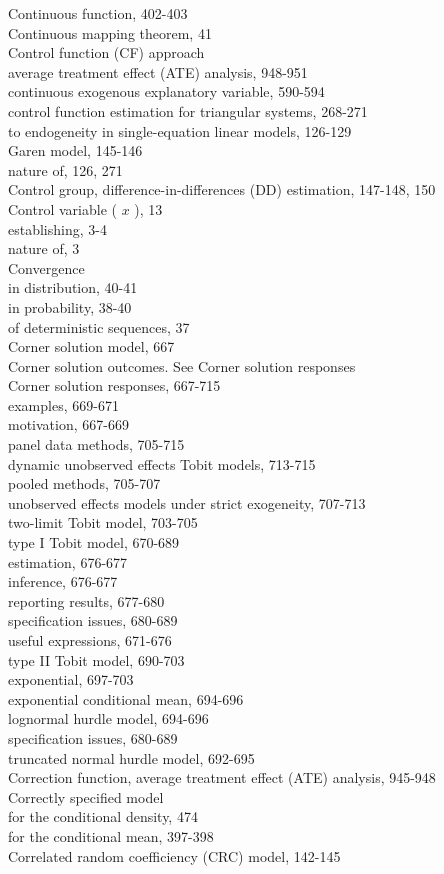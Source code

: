 \documentclass[10pt]{article}
\begin{document}
Continuous function, 402-403\\
Continuous mapping theorem, 41\\
Control function (CF) approach\\
average treatment effect (ATE) analysis, 948-951\\
continuous exogenous explanatory variable, 590-594\\
control function estimation for triangular systems, 268-271\\
to endogeneity in single-equation linear models, 126-129\\
Garen model, 145-146\\
nature of, 126, 271\\
Control group, difference-in-differences (DD) estimation, 147-148, 150\\
Control variable ( $x$ ), 13\\
establishing, 3-4\\
nature of, 3\\
Convergence\\
in distribution, 40-41\\
in probability, 38-40\\
of deterministic sequences, 37\\
Corner solution model, 667\\
Corner solution outcomes. See Corner solution responses\\
Corner solution responses, 667-715\\
examples, 669-671\\
motivation, 667-669\\
panel data methods, 705-715\\
dynamic unobserved effects Tobit models, 713-715\\
pooled methods, 705-707\\
unobserved effects models under strict exogeneity, 707-713\\
two-limit Tobit model, 703-705\\
type I Tobit model, 670-689\\
estimation, 676-677\\
inference, 676-677\\
reporting results, 677-680\\
specification issues, 680-689\\
useful expressions, 671-676\\
type II Tobit model, 690-703\\
exponential, 697-703\\
exponential conditional mean, 694-696\\
lognormal hurdle model, 694-696\\
specification issues, 680-689\\
truncated normal hurdle model, 692-695\\
Correction function, average treatment effect (ATE) analysis, 945-948\\
Correctly specified model\\
for the conditional density, 474\\
for the conditional mean, 397-398\\
Correlated random coefficiency (CRC) model, 142-145
\end{document}
